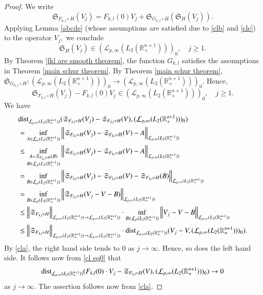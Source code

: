 \documentclass[12pt]{amsart}
\begin{document}
\begin{proof} We write
$$\mathfrak{S}_{F_{k,l}\circ H}(V_j)=F_{k,l}(0)V_j+\mathfrak{S}_{G_{k,l}\circ H}(\mathfrak{S}_H(V_j)).$$
Applying Lemma \ref{abcde} (whose assumptions are satisfied due to \eqref{clb} and \eqref{clc}) to the operator $V_j,$ we conclude
$$\mathfrak{S}_H(V_j)\in (\mathcal{L}_{p,\infty}(L_2(\mathbb{R}^{n+1}_+)))_0,\quad j\geq 1.$$
By Theorem \ref{fkl are smooth theorem}, the function $G_{k,l}$ satisfies the assumptions in Theorem \ref{main schur theorem}. By Theorem \ref{main schur theorem},  $\mathfrak{S}_{G_{k,l}\circ H}:(\mathcal{L}_{p,\infty}(L_2(\mathbb{R}^{n+1}_+)))_0\to (\mathcal{L}_{p,\infty}(L_2(\mathbb{R}^{n+1}_+)))_0.$  Hence,
\begin{equation}\label{cl eq0}
\mathfrak{S}_{F_{k,l}\circ H}(V_j)-F_{k,l}(0)V_j\in (\mathcal{L}_{p,\infty}(L_2(\mathbb{R}^{n+1}_+)))_0,\quad j\geq 1.
\end{equation}
We have
\begin{align*}
&{\rm dist}_{\mathcal{L}_{p,\infty}(L_2(\mathbb{R}^{n+1}_+))}(\mathfrak{S}_{F_{k,l}\circ H}(V_j)-\mathfrak{S}_{F_{k,l}\circ H}(V),(\mathcal{L}_{p,\infty}(L_2(\mathbb{R}^{n+1}_+)))_0)\\
&=\inf_{A\in \mathcal{L}_p(L_2(\mathbb{R}^{n+1}_+))}\Big\|\mathfrak{S}_{F_{k,l}\circ H}(V_j)-\mathfrak{S}_{F_{k,l}\circ H}(V)-A\Big\|_{\mathcal{L}_{p,\infty}(L_2(\mathbb{R}^{n+1}_+))}\\
&\leq\inf_{\substack{A=\mathfrak{S}_{F_{k,l}\circ H}(B)\\ B\in \mathcal{L}_p(L_2(\mathbb{R}^{n+1}_+))}}\Big\|\mathfrak{S}_{F_{k,l}\circ H}(V_j)-\mathfrak{S}_{F_{k,l}\circ H}(V)-A\Big\|_{\mathcal{L}_{p,\infty}(L_2(\mathbb{R}^{n+1}_+))}\\
&=\inf_{B\in \mathcal{L}_p(L_2(\mathbb{R}^{n+1}_+))}\Big\|\mathfrak{S}_{F_{k,l}\circ H}(V_j)-\mathfrak{S}_{F_{k,l}\circ H}(V)-\mathfrak{S}_{F_{k,l}\circ H}(B)\Big\|_{\mathcal{L}_{p,\infty}(L_2(\mathbb{R}^{n+1}_+))}\\
&=\inf_{B\in \mathcal{L}_p(L_2(\mathbb{R}^{n+1}_+))}\Big\|\mathfrak{S}_{F_{k,l}\circ H}(V_j-V-B)\Big\|_{\mathcal{L}_{p,\infty}(L_2(\mathbb{R}^{n+1}_+))}\\
&\leq\Big\|\mathfrak{S}_{F_{k,l}\circ H}\Big\|_{\mathcal{L}_{p,\infty}(L_2(\mathbb{R}^{n+1}_+))\to\mathcal{L}_{p,\infty}(L_2(\mathbb{R}^{n+1}_+))}\cdot\inf_{B\in \mathcal{L}_p(L_2(\mathbb{R}^{n+1}_+))}\Big\|V_j-V-B\Big\|_{\mathcal{L}_{p,\infty}(L_2(\mathbb{R}^{n+1}_+))}\\
&\leq\Big\|\mathfrak{S}_{F_{k,l}\circ H}\Big\|_{\mathcal{L}_{p,\infty}(L_2(\mathbb{R}^{n+1}_+))\to\mathcal{L}_{p,\infty}(L_2(\mathbb{R}^{n+1}_+))}\cdot{\rm dist}_{\mathcal{L}_{p,\infty}(L_2(\mathbb{R}^{n+1}_+))}(V_j-V,(\mathcal{L}_{p,\infty}(L_2(\mathbb{R}^{n+1}_+)))_0).
\end{align*}
By \eqref{cla}, the right hand side tends to $0$ as $j\to\infty.$ Hence, so does the left hand side. It follows now from \eqref{cl eq0} that
$${\rm dist}_{\mathcal{L}_{p,\infty}(L_2(\mathbb{R}^{n+1}_+))}(F_{k,l}(0)\cdot V_j-\mathfrak{S}_{F_{k,l}\circ H}(V),(\mathcal{L}_{p,\infty}(L_2(\mathbb{R}^{n+1}_+)))_0)\to0$$
as $j\to\infty.$ The assertion follows now from \eqref{cla}.
\end{proof}
\end{document}
